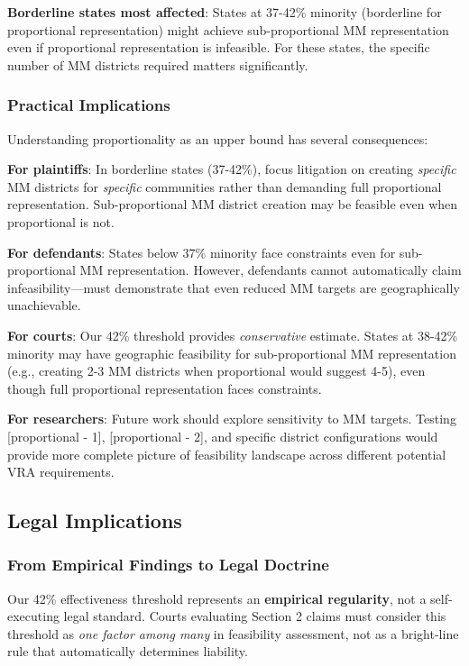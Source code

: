 \textbf{Borderline states most affected}: States at 37-42\% minority (borderline for proportional representation) might achieve sub-proportional MM representation even if proportional representation is infeasible. For these states, the specific number of MM districts required matters significantly.

\subsubsection{Practical Implications}

Understanding proportionality as an upper bound has several consequences:

\textbf{For plaintiffs}: In borderline states (37-42\%), focus litigation on creating \emph{specific} MM districts for \emph{specific} communities rather than demanding full proportional representation. Sub-proportional MM district creation may be feasible even when proportional is not.

\textbf{For defendants}: States below 37\% minority face constraints even for sub-proportional MM representation. However, defendants cannot automatically claim infeasibility---must demonstrate that even reduced MM targets are geographically unachievable.

\textbf{For courts}: Our 42\% threshold provides \emph{conservative} estimate. States at 38-42\% minority may have geographic feasibility for sub-proportional MM representation (e.g., creating 2-3 MM districts when proportional would suggest 4-5), even though full proportional representation faces constraints.

\textbf{For researchers}: Future work should explore sensitivity to MM targets. Testing [proportional - 1], [proportional - 2], and specific district configurations would provide more complete picture of feasibility landscape across different potential VRA requirements.

\subsection{Legal Implications}

\subsubsection{From Empirical Findings to Legal Doctrine}

Our 42\% effectiveness threshold represents an \textbf{empirical regularity}, not a self-executing legal standard. Courts evaluating Section 2 claims must consider this threshold as \emph{one factor among many} in feasibility assessment, not as a bright-line rule that automatically determines liability.

